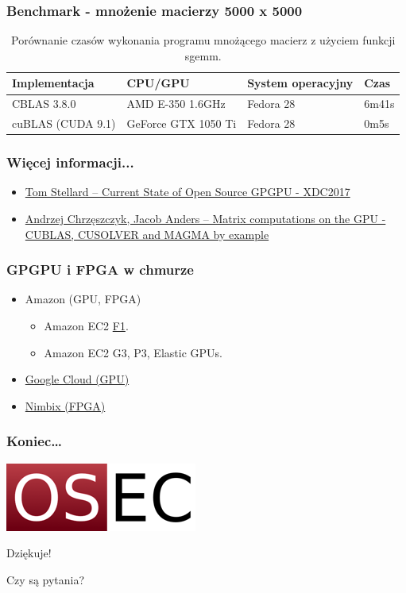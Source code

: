 \documentclass[dvipsnames,table]{beamer}
\begin{document}
\begin{frame}
\frametitle{Benchmark - mnożenie macierzy 5000 x 5000}
\begin{table}[]
\centering
\caption{Porównanie czasów wykonania programu mnożącego macierz z użyciem funkcji sgemm.}
\label{porownanie}
\scriptsize
\begin{tabular}{llll}
\hline
Implementacja & CPU/GPU   & System operacyjny & Czas  \\ \hline
CBLAS 3.8.0   & AMD E-350 1.6GHz & Fedora 28         & 6m41s \\
cuBLAS (CUDA 9.1) & GeForce GTX 1050 Ti & Fedora 28 & 0m5s  \\ \hline
\end{tabular}
\normalsize
\end{table}
\end{frame}

\begin{frame}
\frametitle{Więcej informacji...}
\begin{itemize}
	\item \href{https://www.x.org/wiki/Events/XDC2017/Stellard_GPGPU.pdf}{Tom Stellard -- Current State of Open Source GPGPU - XDC2017}
	\item \href{https://developer.nvidia.com/sites/default/files/akamai/cuda/files/Misc/mygpu.pdf}{Andrzej Chrzęszczyk, Jacob Anders -- Matrix computations on the GPU - CUBLAS, CUSOLVER and MAGMA by example}

\end{itemize}
\end{frame}

\begin{frame}
	\frametitle{GPGPU i FPGA w chmurze}
\begin{itemize}
	\item Amazon (GPU, FPGA)
	\begin{itemize}
		\item Amazon EC2 \href{https://aws.amazon.com/ec2/instance-types/f1/}{F1}.
		\item Amazon EC2 G3, P3, Elastic GPUs.
	\end{itemize}
	\item \href{https://cloud.google.com/gpu/}{Google Cloud (GPU)}
	\item \href{https://www.nimbix.net/xilinx/}{Nimbix (FPGA)}
\end{itemize}
\end{frame}


\begin{frame}
\frametitle{Koniec\ldots}
\begin{center}
\includegraphics[scale=0.5]{img-oseclogo.png}

Dziękuje!

Czy są pytania?

\end{center}
\end{frame}
\end{document}
